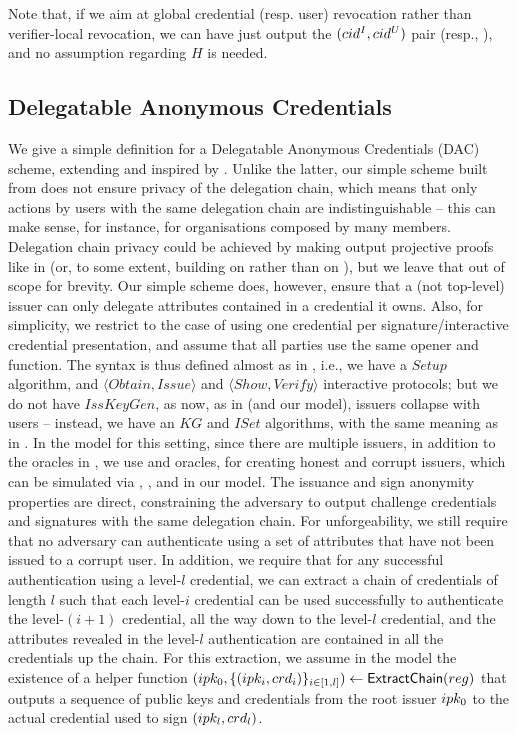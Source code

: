 Note that, if we aim at global credential (resp. user) revocation rather than
verifier-local revocation, we can have \finsp just output the $(cid^I,cid^U)$
pair (resp., \upk), and no assumption regarding $H$ is needed.

\subsection{Delegatable Anonymous Credentials}
\label{sapp:related-models-dac}

We give a simple definition for a Delegatable Anonymous Credentials (DAC)
scheme, extending \cite{fhs19} and inspired by \cite{bcc+09}. Unlike the latter,
our simple scheme built from \CUASGenInt does not ensure privacy of the
delegation chain, which means that only actions by users with the same
delegation chain are indistinguishable -- this can make sense, for instance,
for organisations composed by many members. Delegation chain privacy could be
achieved by making \feval output projective proofs like in \cite{bcc+09} (or,
to some extent, building on \CUASGenHideIss rather than on \CUASGen), but we
leave that out of scope for brevity. Our simple scheme
does, however, ensure that a (not top-level) issuer can only delegate attributes
contained in a credential it owns. Also, for simplicity, we restrict to the case
of using one credential per signature/interactive credential presentation, and
assume that all parties use the same opener and \finsp function.
%
The syntax is thus defined almost as in ,
i.e., we have a $Setup$ algorithm, and $\langle Obtain,Issue\rangle$
and $\langle Show,Verify \rangle$ interactive protocols; but we do not have
$IssKeyGen$, as now, as in \cite{bcc+09} (and our \UAS model), issuers collapse
with users -- instead, we have an $KG$ and $ISet$ algorithms, with the same
meaning as in \UAS.
%
In the model for this setting, since there are multiple issuers, in addition
to the oracles in , we use  and
 oracles,
for creating honest and corrupt issuers, which can be simulated via \HUGEN,
\CUGEN, \ISET and \ICORR in our \UAS model.
%
The issuance and sign anonymity properties are direct, constraining the
adversary to output challenge credentials and signatures with the same
delegation chain. For unforgeability, we still require that no adversary can
authenticate using a set of attributes that have not been issued to a corrupt
user. In addition, we require that for any successful authentication using a
level-$l$ credential, we can extract a chain of credentials of length $l$ such
that each level-$i$ credential can be used successfully to authenticate the
level-$(i+1)$ credential, all the way down to the level-$l$ credential, and the
attributes revealed in the level-$l$ authentication are contained in all the
credentials up the chain. For this extraction, we assume in the model the
existence of a helper function $(ipk_0,\lbrace (ipk_i,crd_i)
\rbrace_{i\in[1,l]}) \gets \mathsf{ExtractChain}(reg)$ that outputs a
sequence of public keys and credentials from the root issuer $ipk_0$ to the
actual credential used to sign $(ipk_l,crd_l)$.

